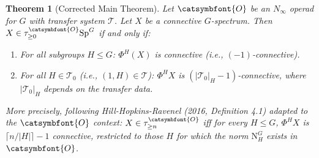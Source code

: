 \documentclass[12pt]{article}
\newtheorem{theorem}{Theorem}
\theoremstyle{definition}
\newcommand{\aO}{{\catsymbfont{O}}}
\begin{document}
\begin{theorem}[Corrected Main Theorem]\label{thm:main-corrected}
Let $\aO$ be an $N_\infty$ operad for $G$ with transfer system $\mathcal{T}$. Let $X$ be a connective $G$-spectrum. Then $X\in\tau_{\geq 0}^{\aO}\mathrm{Sp}^G$ if and only if:
\begin{enumerate}
\item For all subgroups $H\leq G$: $\Phi^H(X)$ is connective (i.e., $(-1)$-connective).
\item For all $H\in\mathcal{T}_0$ (i.e., $(1,H)\in\mathcal{T}$): $\Phi^H X$ is $(|\mathcal{T}_0|_H - 1)$-connective, where $|\mathcal{T}_0|_H$ depends on the transfer data.
\end{enumerate}

More precisely, following Hill-Hopkins-Ravenel (2016, Definition 4.1) adapted to the $\aO$ context: $X\in\tau_{\geq n}^{\aO}$ iff for every $H\leq G$, $\Phi^H X$ is $\lceil n/|H|\rceil - 1$ connective, \emph{restricted to those $H$ for which the norm $\mathrm{N}_H^G$ exists in $\aO$}.
\end{theorem}
\end{document}
